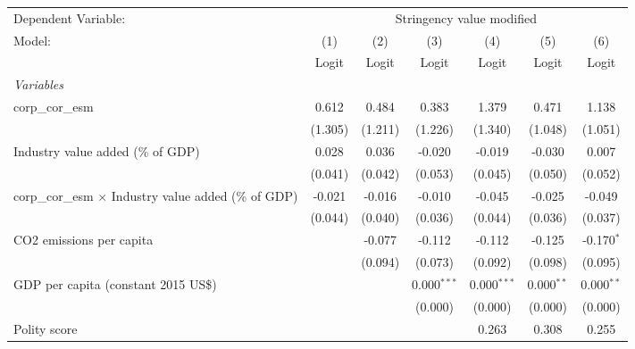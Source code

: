 
\begingroup
\centering
\begin{tabular}{lcccccc}
   \toprule
   Dependent Variable: & \multicolumn{6}{c}{Stringency value modified}\\
   Model:                                                       & (1)     & (2)     & (3)           & (4)           & (5)          & (6)\\  
                                                                &  Logit  & Logit   & Logit         & Logit         & Logit        & Logit\\  
   \midrule
   \emph{Variables}\\
   corp\_cor\_esm                                               & 0.612   & 0.484   & 0.383         & 1.379         & 0.471        & 1.138\\   
                                                                & (1.305) & (1.211) & (1.226)       & (1.340)       & (1.048)      & (1.051)\\   
   Industry value added (\% of GDP)                             & 0.028   & 0.036   & -0.020        & -0.019        & -0.030       & 0.007\\   
                                                                & (0.041) & (0.042) & (0.053)       & (0.045)       & (0.050)      & (0.052)\\   
   corp\_cor\_esm $\times$ Industry value added (\% of GDP)     & -0.021  & -0.016  & -0.010        & -0.045        & -0.025       & -0.049\\   
                                                                & (0.044) & (0.040) & (0.036)       & (0.044)       & (0.036)      & (0.037)\\   
   CO2 emissions per capita                                     &         & -0.077  & -0.112        & -0.112        & -0.125       & -0.170$^{*}$\\   
                                                                &         & (0.094) & (0.073)       & (0.092)       & (0.098)      & (0.095)\\   
   GDP per capita (constant 2015 US\$)                          &         &         & 0.000$^{***}$ & 0.000$^{***}$ & 0.000$^{**}$ & 0.000$^{**}$\\   
                                                                &         &         & (0.000)       & (0.000)       & (0.000)      & (0.000)\\   
   Polity score                                                 &         &         &               & 0.263         & 0.308        & 0.255\\   

\end{tabular}
